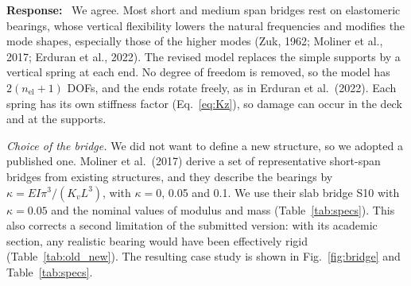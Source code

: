 \documentclass[11pt]{article}
\newenvironment{response}{\par\smallskip\noindent\color{resp}\textbf{Response:}\ }{\par}
\begin{document}
\begin{response}
We agree. Most short and medium span bridges rest on elastomeric bearings, whose vertical flexibility lowers the natural
frequencies and modifies the mode shapes, especially those of the higher modes (Zuk, 1962; Moliner et al., 2017; Erduran et al.,
2022). The revised model replaces the simple supports by a vertical spring at each end. No degree of freedom is removed, so the
model has $2(n_{\mathrm{el}}+1)$ DOFs, and the ends rotate freely, as in Erduran et al.\ (2022). Each spring has its own stiffness
factor (Eq.~\eqref{eq:Kz}), so damage can occur in the deck and at the supports.

\textit{Choice of the bridge.} We did not want to define a new structure, so we adopted a published one. Moliner et al.\ (2017)
derive a set of representative short-span bridges from existing structures, and they describe the bearings by
$\kappa=EI\pi^3/(K_vL^3)$, with $\kappa=0$, 0.05 and 0.1. We use their slab bridge S10 with $\kappa=0.05$ and the nominal values of
modulus and mass (Table~\ref{tab:specs}). This also corrects a second limitation of the submitted version: with its academic
section, any realistic bearing would have been effectively rigid (Table~\ref{tab:old_new}). The resulting case study is shown in Fig.~\ref{fig:bridge} and Table~\ref{tab:specs}.


\end{response}
\end{document}
